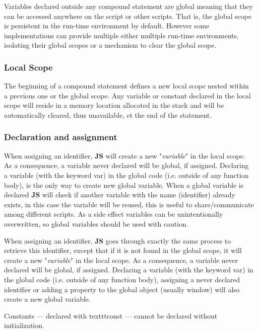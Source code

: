 Variables declared outside any compound statement are global meaning that they can be accessed anywhere on the script or other scripts. That is, the global scope is persistent in the run-time environment by default. However some implementations can provide multiple either multiple run-time environments, isolating their global scopes or a mechanism to clear the global scope. 

\subsubsection {Local Scope}

The beginning of a compound statement defines a new local scope nested within a previous one or the global scope. Any variable or constant declared in the local scope will reside in a memory location allocated in the stack and will be automatically cleared, thus unavailable, et the end of the statement. 

\subsubsection{Declaration and assignment}

When assigning an identifier, \textbf{\textmu JS} will create a new "\textit{variable}" in the local scope. As a consequence, a variable never declared will be global, if assigned. Declaring a variable (with the keyword var) in the global code (i.e. outside of any function body), is the only way to create new global variable. When a global variable is declared \textbf{\textmu JS} will check if another variable with the  name (identifier) already exists, in this case the variable will be reused, this is useful to share/communicate among different scripts. As a side effect variables can be unintentionally overwritten, so global variables should be used with caution.

When assigning an identifier, \textbf{\textmu JS} goes through exactly the same process to retrieve this identifier, except that if it is not found in the global scope, it will create a new "\textit{variable}" in the local scope. As a consequence, a variable never declared will be global, if assigned. Declaring a variable (with the keyword var) in the global code (i.e. outside of any function body), assigning a never declared identifier or adding a property to the global object (usually window) will also create a new global variable.

Constants --- declared with texttt{const} --- cannot be declared without initialization.\\

